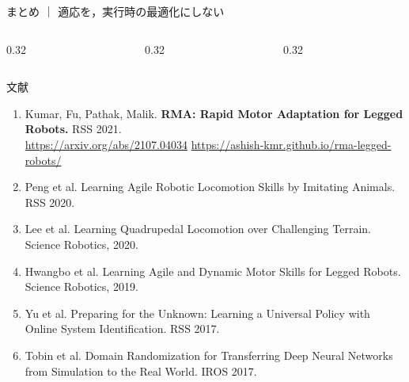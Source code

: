 \documentclass[aspectratio=169,10pt,t]{beamer}
\begin{document}
\begin{frame}{まとめ ｜ 適応を，実行時の最適化にしない}
  \begin{columns}[T,onlytextwidth]
    \begin{column}{0.32\textwidth}
    \end{column}
    \hfill
    \begin{column}{0.32\textwidth}
    \end{column}
    \hfill
    \begin{column}{0.32\textwidth}
    \end{column}
  \end{columns}

  \vspace{0.9em}
  \centering
  \hspace{1.4em}%

\end{frame}

\begin{frame}{文献}
  {\footnotesize
  \begin{enumerate}
    \item Kumar, Fu, Pathak, Malik.
      \textbf{RMA: Rapid Motor Adaptation for Legged Robots.}
      RSS 2021.\\
      \url{https://arxiv.org/abs/2107.04034}
      \quad
      \url{https://ashish-kmr.github.io/rma-legged-robots/}
    \item Peng et al. Learning Agile Robotic Locomotion Skills by Imitating Animals. RSS 2020.
    \item Lee et al. Learning Quadrupedal Locomotion over Challenging Terrain. Science Robotics, 2020.
    \item Hwangbo et al. Learning Agile and Dynamic Motor Skills for Legged Robots. Science Robotics, 2019.
    \item Yu et al. Preparing for the Unknown: Learning a Universal Policy with Online System Identification. RSS 2017.
    \item Tobin et al. Domain Randomization for Transferring Deep Neural Networks from Simulation to the Real World. IROS 2017.
  \end{enumerate}}
\end{frame}
\end{document}
